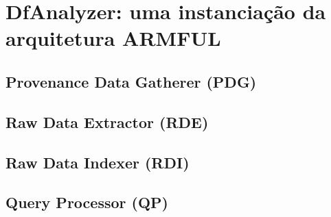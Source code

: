 

\section{DfAnalyzer: uma instanciação da arquitetura ARMFUL}

\subsection{Provenance Data Gatherer (PDG)}

\subsection{Raw Data Extractor (RDE)}

\subsection{Raw Data Indexer (RDI)}


\subsection{Query Processor (QP)}